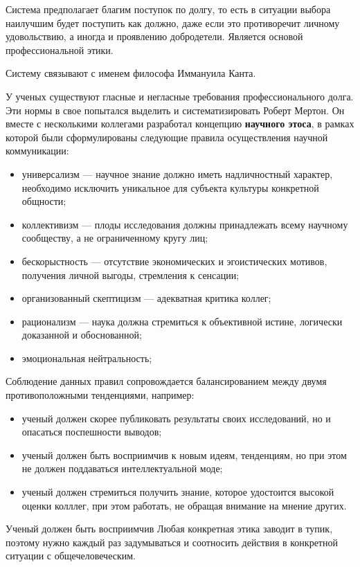 Система предполагает благим поступок по долгу, то есть в ситуации выбора наилучшим будет
поступить как должно, даже если это противоречит личному удовольствию, а иногда
и проявлению добродетели. Является основой профессиональной этики.

Систему связывают с именем философа Иммануила Канта.


У ученых существуют гласные и негласные требования профессионального долга. Эти нормы в свое попытался выделить и систематизировать Роберт Мертон. Он вместе с несколькими коллегами разработал концепцию \textbf{научного этоса}, в рамках которой были сформулированы следующие правила осуществления научной коммуникации: 
\begin{itemize}
    \item универсализм --- научное знание должно иметь надличностный
    характер, необходимо исключить уникальное для субъекта культуры конкретной общности;
    \item коллективизм --- плоды исследования должны принадлежать всему научному сообществу,
    а не ограниченному кругу лиц;
    \item бескорыстность --- отсутствие экономических и эгоистических мотивов, получения личной выгоды, стремления к сенсации;
    \item организованный скептицизм --- адекватная критика коллег;
    \item рационализм --- наука должна стремиться к объективной истине, логически доказанной и
    обоснованной;
    \item эмоциональная нейтральность;
\end{itemize}

Соблюдение данных правил сопровождается балансированием между двумя противоположными тенденциями, например:
\begin{itemize}
    \item ученый должен скорее публиковать результаты своих исследований, но и опасаться
    поспешности выводов;
    \item ученый должен быть восприимчив к новым идеям, тенденциям, но при этом не должен поддаваться интеллектуальной моде;
    \item ученый должен стремиться получить знание, которое удостоится высокой оценки колллег, при этом работать, не обращая внимание на мнение других.
\end{itemize} Ученый должен быть восприимчив
Любая конкретная этика заводит в тупик, поэтому нужно каждый раз задумываться и соотносить действия в конкретной ситуации с общечеловеческим. 

